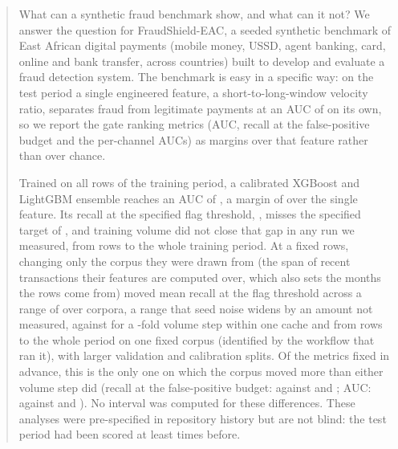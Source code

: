\begin{abstract}
What can a synthetic fraud benchmark show, and what can it not? We answer the question for
FraudShield-EAC, a seeded synthetic benchmark of East African digital payments (mobile money, USSD,
agent banking, card, online and bank transfer, across \nCountries{} countries) built to develop and
evaluate a fraud detection system. The benchmark is easy in a specific way: on the test period a single
engineered feature, a short-to-long-window velocity ratio, separates fraud from legitimate payments at
an AUC of \nGateFloor{} on its own, so we report the gate ranking metrics (AUC, recall at the false-positive budget and the per-channel AUCs) as margins over that feature rather than over chance.

Trained on all \nFvTrainRows{} rows of the training period, a calibrated XGBoost and LightGBM ensemble
reaches an AUC of \nFvAUC{}, a margin of \nFvMargin{} over the single feature. Its recall at the
specified flag threshold, \nFvRecallSix{}, misses the specified target of \nTargetRecall{}, and
training volume did not close that gap in any run we measured, from \nTrainUsed{} rows to the whole
training period. At a fixed \nTrainUsed{} rows, changing only the corpus they were drawn from (the span
of recent transactions their features are computed over, which also sets the months the rows come
from) moved mean recall at the flag threshold
across a range of \nSelMeanRange{} over \nSelDepthCount{} corpora, a range that seed noise widens by an
amount not measured, against \nLcSeedGainAC{} for a \nLcVolumeFactorAC{}-fold volume step within one
cache and \nFvSeedGainFixed{} from \nTrainUsed{} rows to the whole period on one fixed corpus (identified by the workflow that ran it), with larger
validation and calibration splits. Of the
metrics fixed in advance, this is the only one on which the corpus moved more than either volume step
did (recall at the false-positive budget: \nSelBudgetRange{} against \nLcSeedBudgetGainAC{} and
\nFvSeedBudgetGainFixed{}; AUC: \nSelAucRange{} against \nLcSeedAucGainAC{} and
\nFvSeedAucGainFixed{}). No interval was computed for these differences. These analyses were
pre-specified in repository history but are not blind: the test period had been scored at least
\nPriorReads{} times before.


\end{abstract}
